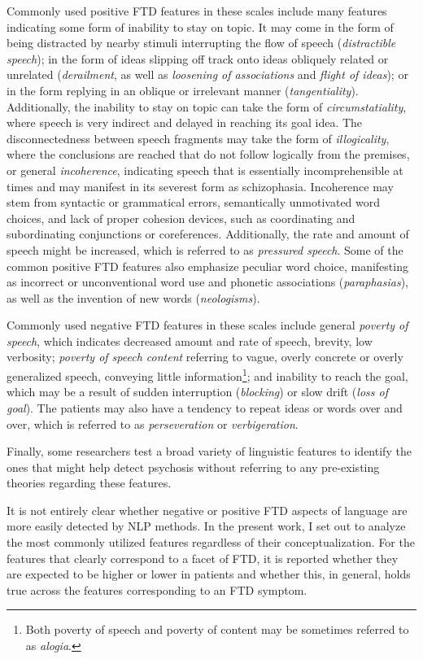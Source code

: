 Commonly used positive FTD features in these scales include many features indicating some form of inability to stay on topic. It may come in the form of being distracted by nearby stimuli interrupting the flow of speech (\textit{distractible speech}); in the form of ideas slipping off track onto ideas obliquely related or unrelated (\textit{derailment}, as well as \textit{loosening of associations} and \textit{flight of ideas}); or in the form replying in an oblique or irrelevant manner (\textit{tangentiality}). Additionally, the inability to stay on topic can take the form of \textit{circumstatiality}, where speech is very indirect and delayed in reaching its goal idea. The disconnectedness between speech fragments may take the form of \textit{illogicality}, where the conclusions are reached that do not follow logically from the premises, or general \textit{incoherence}, indicating speech that is essentially incomprehensible at times and may manifest in its severest form as schizophasia. Incoherence may stem from syntactic or grammatical errors, semantically unmotivated word choices, and lack of proper cohesion devices, such as coordinating and subordinating conjunctions or coreferences. Additionally, the rate and amount of speech might be increased, which is referred to as \textit{pressured speech}. Some of the common positive FTD features also emphasize peculiar word choice, manifesting as incorrect or unconventional word use and phonetic associations (\textit{paraphasias}), as well as the invention of new words (\textit{neologisms}).

Commonly used negative FTD features in these scales include general \textit{poverty of speech}, which indicates decreased amount and rate of speech, brevity, low verbosity; \textit{poverty of speech content} referring to vague, overly concrete or overly generalized speech, conveying little information\footnote{Both poverty of speech and poverty of content may be sometimes referred to as \textit{alogia}.}; and inability to reach the goal, which may be a result of sudden interruption (\textit{blocking}) or slow drift  (\textit{loss of goal}). The patients may also have a tendency to repeat ideas or words over and over, which is referred to as \textit{perseveration} or \textit{verbigeration}.

Finally, some researchers test a broad variety of linguistic features to identify the ones that might help detect psychosis without referring to any pre-existing theories regarding these features.

It is not entirely clear whether negative or positive FTD aspects of language are more easily detected by NLP methods. In the present work, I set out to analyze the most commonly utilized features regardless of their conceptualization. For the features that clearly correspond to a facet of FTD, it is reported whether they are expected to be higher or lower in patients and whether this, in general, holds true across the features corresponding to an FTD symptom. 

